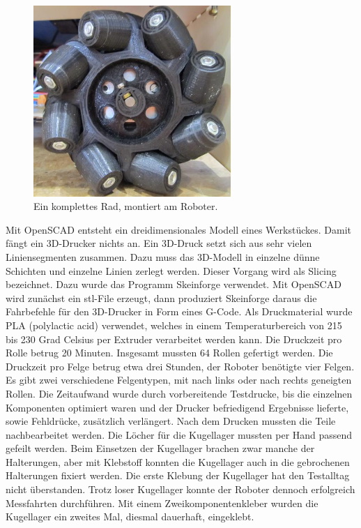 \documentclass[a4paper,bibtotoc,oneside]{scrbook}
\begin{document}
\begin{figure}[htbp]
\centering
\includegraphics[width=75mm]{img/rad.jpg}
\caption{Ein komplettes Rad, montiert am Roboter.}\label{rad2}
\end{figure}


\noindent Mit OpenSCAD entsteht ein dreidimensionales Modell eines Werkstückes. Damit fängt ein 3D-Drucker nichts an. Ein 3D-Druck setzt sich aus sehr vielen Liniensegmenten zusammen. Dazu muss das 3D-Modell in einzelne dünne Schichten und einzelne Linien zerlegt werden. Dieser Vorgang wird als Slicing bezeichnet. Dazu wurde das Programm Skeinforge verwendet. Mit OpenSCAD wird zunächst ein stl-File erzeugt, dann produziert Skeinforge daraus die Fahrbefehle für den 3D-Drucker in Form eines G-Code. Als Druckmaterial wurde PLA (polylactic acid) verwendet, welches in einem Temperaturbereich von 215 bis 230 Grad Celsius per Extruder verarbeitet werden kann.    
Die Druckzeit pro Rolle betrug 20 Minuten. Insgesamt mussten 64 Rollen gefertigt werden. Die Druckzeit pro Felge betrug etwa drei Stunden, der Roboter benötigte vier Felgen. Es gibt zwei verschiedene Felgentypen, mit nach links oder nach rechts geneigten Rollen. 
Die Zeitaufwand wurde durch vorbereitende Testdrucke, bis die einzelnen Komponenten optimiert waren und der Drucker befriedigend Ergebnisse lieferte, sowie Fehldrücke, zusätzlich verlängert. 
Nach dem Drucken mussten die Teile nachbearbeitet werden. Die Löcher für die Kugellager mussten per Hand passend gefeilt werden. Beim  Einsetzen der Kugellager brachen zwar manche der Halterungen, aber mit Klebstoff konnten die Kugellager auch in die gebrochenen Halterungen fixiert werden. Die erste Klebung der Kugellager hat den Testalltag nicht überstanden. Trotz loser Kugellager konnte der Roboter dennoch erfolgreich Messfahrten durchführen. Mit einem Zweikomponentenkleber wurden die Kugellager ein zweites Mal, diesmal dauerhaft, eingeklebt.
\end{document}
